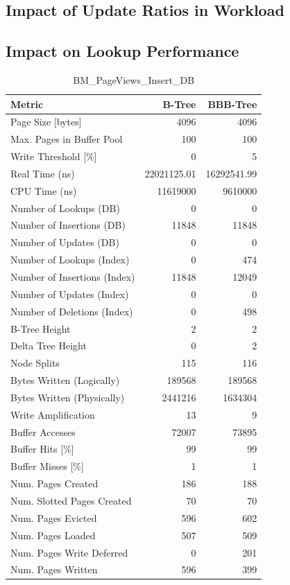 \subsection*{Impact of Update Ratios in Workload}

\subsection*{Impact on Lookup Performance}


\begin{table}[ht]
\centering
\caption{BM\_PageViews\_Insert\_DB}
\label{tab:bm_pageviews_insert_db}
\begin{tabular}{lrr}
\toprule
Metric & B-Tree & BBB-Tree \\
\midrule
Page Size [bytes] & 4096 & 4096 \\
Max. Pages in Buffer Pool & 100 & 100 \\
Write Threshold [\%] & 0 & 5 \\
\midrule
Real Time (ns) & 22021125.01 & 16292541.99 \\
CPU Time (ns) & 11619000 & 9610000 \\
\midrule
Number of Lookups (DB) & 0 & 0 \\
Number of Insertions (DB) & 11848 & 11848 \\
Number of Updates (DB) & 0 & 0 \\
\midrule
Number of Lookups (Index) & 0 & 474 \\
Number of Insertions (Index) & 11848 & 12049 \\
Number of Updates (Index) & 0 & 0 \\
Number of Deletions (Index) & 0 & 498 \\
\midrule
B-Tree Height & 2 & 2 \\
Delta Tree Height & 0 & 2 \\
Node Splits & 115 & 116 \\
\midrule
Bytes Written (Logically) & 189568 & 189568 \\
Bytes Written (Physically) & 2441216 & 1634304 \\
Write Amplification & 13 & 9 \\
\midrule
Buffer Accesses & 72007 & 73895 \\
Buffer Hits [\%] & 99 & 99 \\
Buffer Misses [\%] & 1 & 1 \\
\midrule
Num. Pages Created & 186 & 188 \\
Num. Slotted Pages Created & 70 & 70 \\
Num. Pages Evicted & 596 & 602 \\
Num. Pages Loaded & 507 & 509 \\
Num. Pages Write Deferred & 0 & 201 \\
Num. Pages Written & 596 & 399 \\
\bottomrule
\end{tabular}
\end{table}

